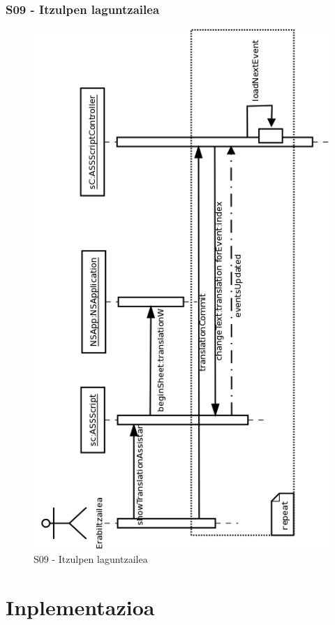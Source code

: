 \subsubsection{S09 - Itzulpen laguntzailea}
\begin{figure}[htp]
\begin{center}
\includegraphics[scale=0.4]{Pictures/Chapter4/Diseinua/S09.png}
\caption{S09 - Itzulpen laguntzailea}
\label{s09d}
\end{center}
\end{figure}

\newpage

\section{Inplementazioa}

